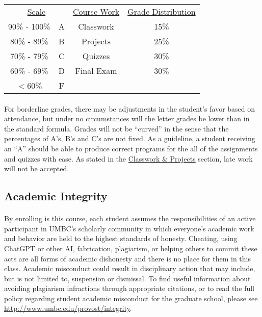 \documentclass[letter,10pt]{article}
\begin{document}
\begin{center}
\begin{tabular}{ c c || c c}
\multicolumn{2}{c||}{\underline{Scale}} & \underline{Course Work} & \underline{Grade Distribution} \\
90\% - 100\% & A & Classwork & 15\% \\
80\% - 89\%  & B & Projects & 25\% \\
70\% - 79\%  & C & Quizzes & 30\% \\
60\% - 69\%  & D & Final Exam & 30\% \\
$<$60\%      & F &
\end{tabular}
\end{center}

\paragraph{}For borderline grades, there may be adjustments in the student's favor based on attendance, but under no circumstances will the letter grades be lower than in the standard formula. Grades will not be ``curved'' in the sense that the percentages of A's, B's and C's are not fixed. As a guideline, a student receiving an ``A'' should be able to produce correct programs for the all of the assignments and quizzes with ease. As stated in the \hyperlink{sec:cwhw}{Classwork \& Projects} section, late work will not be accepted.

\subsection*{Academic Integrity}
\paragraph{}By enrolling is this course, each student assumes the responsibilities of an active participant in UMBC's scholarly community in which everyone's academic work and behavior are held to the highest standards of honesty. Cheating, using ChatGPT or other AI, fabrication, plagiarism, or helping others to commit these acts are all forms of academic dishonesty and there is no place for them in this class. Academic misconduct could result in disciplinary action that may include, but is not limited to, suspension or dismissal. To find useful information about avoiding plagiarism infractions through appropriate citations, or to read the full policy regarding student academic misconduct for the graduate school, please see \url{http://www.umbc.edu/provost/integrity}.
\end{document}
